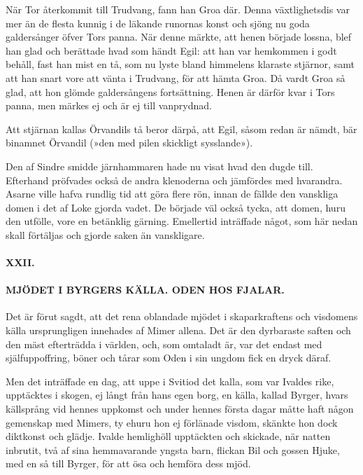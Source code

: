 När Tor återkommit till Trudvang, fann han Groa där. Denna
växtlighetsdis var mer än de flesta kunnig i de läkande runornas konst
och sjöng nu goda galdersånger öfver Tors panna. När denne märkte, att
henen började lossna, blef han glad och berättade hvad som händt Egil:
att han var hemkommen i godt behåll, fast han mist en tå, som nu lyste
bland himmelens klaraste stjärnor, samt att han snart vore att vänta i
Trudvang, för att hämta Groa. Då vardt Groa så glad, att hon glömde
galdersångens fortsättning. Henen
\protect\hypertarget{lb1625905.xhtmlux5cux23start67}{}{}\protect\hypertarget{lb1625905.xhtmlux5cux23start67-a}{}{}\protect\hypertarget{lb1625905.xhtmlux5cux23start67-b}{}{}\protect\hypertarget{lb1625905.xhtmlux5cux23start67-c}{}{}\protect\hypertarget{lb1625905.xhtmlux5cux23start67-d}{}{}
är därför kvar i Tors panna, men märkes ej och är ej till vanprydnad.

Att stjärnan kallas Örvandils tå beror därpå, att Egil, såsom redan är
nämdt, bär binamnet Örvandil (»den med pilen skickligt sysslande»).

Den af Sindre smidde järnhammaren hade nu visat hvad den dugde till.
Efterhand pröfvades också de andra klenoderna och jämfördes med
hvarandra. Asarne ville hafva rundlig tid att göra flere rön, innan de
fällde den vanskliga domen i det af Loke gjorda vadet. De började väl
också tycka, att domen, huru den utfölle, vore en betänklig gärning.
Emellertid inträffade något, som här nedan skall förtäljas och gjorde
saken än vanskligare.

\paragraph{XXII.}

\paragraph{MJÖDET I BYRGERS KÄLLA. ODEN HOS FJALAR.}

Det är förut sagdt, att det rena oblandade mjödet i skaparkraftens och
visdomens källa ursprungligen innehades af Mimer allena. Det är den
dyrbaraste saften och den mäst efterträdda i världen, och, som omtaladt
är, var det endast med själfuppoffring, böner och tårar som Oden i sin
ungdom fick en dryck däraf.

Men det inträffade en dag, att uppe i Svitiod det kalla, som var Ivaldes
rike, upptäcktes i skogen, ej långt från hans egen borg, en källa,
kallad Byrger, hvars källsprång vid hennes uppkomst och under hennes
första dagar måtte haft någon gemenskap med Mimers, ty ehuru hon ej
förlänade visdom, skänkte hon dock diktkonst och glädje. Ivalde
hemlighöll upptäckten och skickade, när natten inbrutit, två af sina
hemmavarande yngsta barn, flickan Bil och gossen Hjuke, med en så till
Byrger, för att ösa och hemföra dess mjöd.


